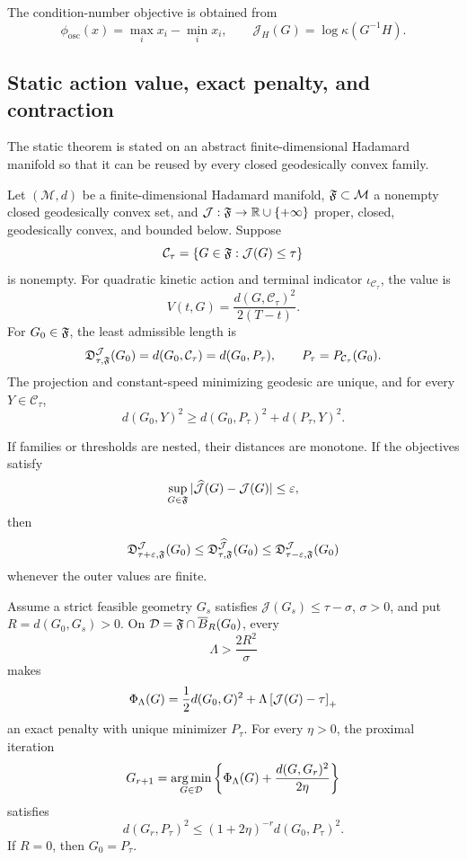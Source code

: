 The condition-number objective is obtained from
\[
  \phi_{\mathrm{osc}}(x)=\max_i x_i-\min_i x_i,
  \qquad
  \mathcal J_H(G)=\log\kappa(G^{-1}H).
\]

\subsection{Static action value, exact penalty, and contraction}

The static theorem is stated on an abstract finite-dimensional Hadamard
manifold so that it can be reused by every closed geodesically convex family.

\begin{theorem}
\label{thm:restricted-geometrodynamic-mother}
Let \((\mathcal M,d)\) be a finite-dimensional Hadamard manifold,
\(\mathfrak F\subset\mathcal M\) a nonempty closed geodesically convex set, and
\(\mathcal J:\mathfrak F\to\mathbb R\cup\{+\infty\}\) proper, closed, geodesically convex,
and bounded below.  Suppose
\[
  \mathcal C_\tau=\{G\in\mathfrak F:\mathcal J(G)\le\tau\}
\]
is nonempty.  For quadratic kinetic action and terminal indicator
\(\iota_{\mathcal C_\tau}\), the value is
\[
  V(t,G)=\frac{d(G,\mathcal C_\tau)^2}{2(T-t)}.
\]
For \(G_0\in\mathfrak F\), the least admissible length is
\[
  \mathfrak D_{\tau,\mathfrak F}^{\mathcal J}(G_0)
  =d(G_0,\mathcal C_\tau)
  =d(G_0,P_\tau),
  \qquad
  P_\tau=P_{\mathcal C_\tau}(G_0).
\]
The projection and constant-speed minimizing geodesic are unique, and for
every \(Y\in\mathcal C_\tau\),
\[
  d(G_0,Y)^2
  \ge
  d(G_0,P_\tau)^2+d(P_\tau,Y)^2.
\]

If families or thresholds are nested, their distances are monotone.  If the
objectives satisfy
\[
  \sup_{G\in\mathfrak F}|\widehat{\mathcal J}(G)-\mathcal J(G)|\le\varepsilon,
\]
then
\[
  \mathfrak D_{\tau+\varepsilon,\mathfrak F}^{\mathcal J}(G_0)
  \le
  \mathfrak D_{\tau,\mathfrak F}^{\widehat{\mathcal J}}(G_0)
  \le
  \mathfrak D_{\tau-\varepsilon,\mathfrak F}^{\mathcal J}(G_0)
\]
whenever the outer values are finite.

Assume a strict feasible geometry \(G_s\) satisfies
\(\mathcal J(G_s)\le\tau-\sigma\), \(\sigma>0\), and put
\(R=d(G_0,G_s)>0\).  On
\(\mathcal D=\mathfrak F\cap\overline B_R(G_0)\), every
\[
  \Lambda>\frac{2R^2}{\sigma}
\]
makes
\[
  \Phi_\Lambda(G)
  =
  \frac12d(G_0,G)^2
  +\Lambda\left[\mathcal J(G)-\tau\right]_+
\]
an exact penalty with unique minimizer \(P_\tau\).  For every \(\eta>0\),
the proximal iteration
\[
  G_{r+1}
  =
  \operatorname*{arg\,min}_{G\in\mathcal D}
  \left\{\Phi_\Lambda(G)+\frac{d(G,G_r)^2}{2\eta}\right\}
\]
satisfies
\[
  d(G_r,P_\tau)^2
  \le
  (1+2\eta)^{-r}d(G_0,P_\tau)^2.
\]
If \(R=0\), then \(G_0=P_\tau\).
\end{theorem}

